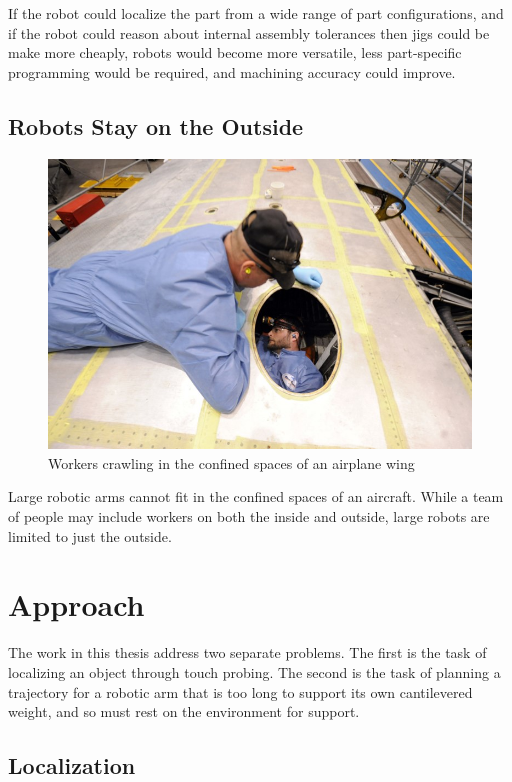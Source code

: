 \documentclass[../thesis.tex]{subfiles}
\begin{document}
If the robot could localize the part from a wide range of part configurations, and if the robot could reason about internal assembly tolerances then jigs could be make more cheaply, robots would become more versatile, less part-specific programming would be required, and machining accuracy could improve.

\subsection{Robots Stay on the Outside}

\begin{figure}
  \centering
  \label{fig:PeopleInWing}
  \includegraphics[width=.7\linewidth]{./Introduction/PeopleInWing.jpg}  
  \caption{Workers crawling in the confined spaces of an airplane wing}
\end{figure}

Large robotic arms cannot fit in the confined spaces of an aircraft.
While a team of people may include workers on both the inside and outside, large robots are limited to just the outside.



\section{Approach}
The work in this thesis address two separate problems. The first is the task of localizing an object through touch probing.
The second is the task of planning a trajectory for a robotic arm that is too long to support its own cantilevered weight, and so must rest on the environment for support.

\subsection{Localization}
\end{document}

